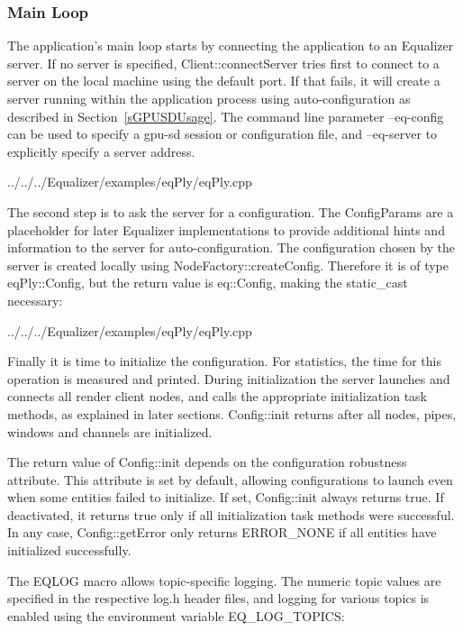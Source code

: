 \documentclass[10pt,a4]{scrartcl}
\newcommand{\sref}[1]{Section~\ref{#1}}
\begin{document}
\subsubsection{Main Loop}

The application's main loop starts by connecting the application to an Equalizer
server. If no server is specified, \textsf{Client::connectServer} tries first to
connect to a server on the local machine using the default port. If that fails,
it will create a server running within the application process using
auto-configuration as described in \sref{sGPUSDUsage}. The command line
parameter \textsf{--eq-config} can be used to specify a gpu-sd session or
configuration file, and \textsf{--eq-server} to explicitly specify a server
address.

{\footnotesize
  {../../../Equalizer/examples/eqPly/eqPly.cpp}}

The second step is to ask the server for a configuration. The
\textsf{ConfigParams} are a placeholder for later Equalizer implementations to
provide additional hints and information to the server for
auto-configuration. The configuration chosen by the server is created locally
using \textsf{NodeFactory::createConfig}. Therefore it is of type
\textsf{eqPly::Config}, but the return value is \textsf{eq::Config}, making the
static\_cast necessary:

{\footnotesize
  {../../../Equalizer/examples/eqPly/eqPly.cpp}}

Finally it is time to initialize the configuration. For statistics, the
time for this operation is measured and printed. During initialization
the server launches and connects all render client nodes, and calls the
appropriate initialization task methods, as explained in later
sections. \textsf{Config::init} returns after all nodes, pipes,
windows and channels are initialized.

The return value of \textsf{Config::init} depends on the configuration
robustness attribute. This attribute is set by default, allowing configurations
to launch even when some entities failed to initialize. If set,
\textsf{Config::init} always returns true. If deactivated, it returns
\textsf{true} only if all initialization task methods were successful. In any
case, \textsf{Config::getError} only returns \textsf{ERROR\_NONE} if all
entities have initialized successfully.

The \textsf{EQLOG} macro allows topic-specific logging. The numeric
topic values are specified in the respective \textsf{log.h} header
files, and logging for various topics is enabled using the environment
variable \textsf{EQ\_LOG\_TOPICS}:
\end{document}
